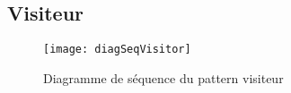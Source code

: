 \subsection{Visiteur}
\begin{figure}[h]
\begin{center}
    \texttt{[image: diagSeqVisitor]}
\end{center}
    \caption{Diagramme de séquence du pattern visiteur}
    \label{sequence-visiteur}
\end{figure}